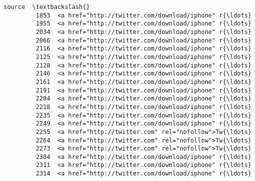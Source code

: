 \documentclass[11pt]{article}
\begin{document}
\begin{Verbatim}[commandchars=\\\{\}]
                                                          source  \textbackslash{}
         1853  <a href="http://twitter.com/download/iphone" r{\ldots}   
         1955  <a href="http://twitter.com/download/iphone" r{\ldots}   
         2034  <a href="http://twitter.com/download/iphone" r{\ldots}   
         2066  <a href="http://twitter.com/download/iphone" r{\ldots}   
         2116  <a href="http://twitter.com/download/iphone" r{\ldots}   
         2125  <a href="http://twitter.com/download/iphone" r{\ldots}   
         2128  <a href="http://twitter.com/download/iphone" r{\ldots}   
         2146  <a href="http://twitter.com/download/iphone" r{\ldots}   
         2161  <a href="http://twitter.com/download/iphone" r{\ldots}   
         2191  <a href="http://twitter.com/download/iphone" r{\ldots}   
         2204  <a href="http://twitter.com/download/iphone" r{\ldots}   
         2218  <a href="http://twitter.com/download/iphone" r{\ldots}   
         2235  <a href="http://twitter.com/download/iphone" r{\ldots}   
         2249  <a href="http://twitter.com/download/iphone" r{\ldots}   
         2255  <a href="http://twitter.com" rel="nofollow">Tw{\ldots}   
         2264  <a href="http://twitter.com" rel="nofollow">Tw{\ldots}   
         2273  <a href="http://twitter.com" rel="nofollow">Tw{\ldots}   
         2304  <a href="http://twitter.com/download/iphone" r{\ldots}   
         2311  <a href="http://twitter.com/download/iphone" r{\ldots}   
         2314  <a href="http://twitter.com/download/iphone" r{\ldots}   
         

\end{Verbatim}
\end{document}
